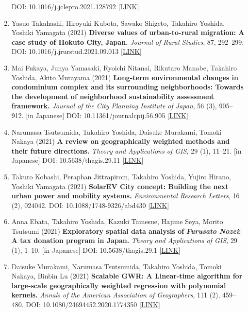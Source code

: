 \documentclass[]{book}
\begin{document}
\begin{enumerate}
  DOI: 10.1016/j.jclepro.2021.128792 {[}\href{https://doi.org/10.1016/j.jclepro.2021.128792}{LINK}{]}
\item
  Yasuo Takahashi, Hiroyuki Kubota, Sawako Shigeto, Takahiro Yoshida, Yoshiki Yamagata (2021)
  \textbf{Diverse values of urban-to-rural migration: A case study of Hokuto City, Japan.}
  \emph{Journal of Rural Studies}, 87, 292--299.
  DOI: 10.1016/j.jrurstud.2021.09.013 {[}\href{https://www.sciencedirect.com/science/article/abs/pii/S0743016721002771}{LINK}{]}
\item
  Mai Fukaya, Junya Yamasaki, Ryoichi Nitanai, Rikutaro Manabe, Takahiro Yoshida, Akito Murayama (2021)
  \textbf{Long-term environmental changes in condominium complex and its surrounding neighborhoods: Towards the development of neighborhood sustainability assessment framework.}
  \emph{Journal of the City Planning Institute of Japan}, 56 (3), 905--912. {[}in Japanese{]}
  DOI: 10.11361/journalcpij.56.905 {[}\href{https://www.jstage.jst.go.jp/article/journalcpij/56/3/56_905/_article/-char/en}{LINK}{]}
\item
  Narumasa Tsutsumida, Takahiro Yoshida, Daisuke Murakami, Tomoki Nakaya (2021)
  \textbf{A review on geographically weighted methods and their future directions.}
  \emph{Theory and Applications of GIS,} 29 (1), 11--21. {[}in Japanese{]}
  DOI: 10.5638/thagis.29.11 {[}\href{https://www.gisa-japan.org/dl/gisajounal.html}{LINK}{]}
\item
  Takuro Kobashi, Peraphan Jittrapirom, Takahiro Yoshida, Yujiro Hirano, Yoshiki Yamagata (2021)
  \textbf{SolarEV City concept: Building the next urban power and mobility systems.}
  \emph{Environmental Research Letters}, 16 (2), 024042.
  DOI: 10.1088/1748-9326/abd430 {[}\href{https://doi.org/10.1088/1748-9326/abd430}{LINK}{]}
\item
  Anna Ebata, Takahiro Yoshida, Kazuki Tamesue, Hajime Seya, Morito Tsutsumi (2021)
  \textbf{Exploratory spatial data analysis of} \textbf{\emph{Furusato Nozei}: A tax donation program in Japan.}
  \emph{Theory and Applications of GIS,} 29 (1), 1--10. {[}in Japanese{]}
  DOI: 10.5638/thagis.29.1 {[}\href{https://www.gisa-japan.org/dl/gisajounal.html}{LINK}{]}
\item
  Daisuke Murakami, Narumasa Tsutsumida, Takahiro Yoshida, Tomoki Nakaya, Binbin Lu (2021)
  \textbf{Scalable GWR: A Linear-time algorithm for large-scale geographically weighted regression with polynomial kernels.}
  \emph{Annals of the American Association of Geographers}, 111 (2), 459--480.
  DOI: 10.1080/24694452.2020.1774350 {[}\href{https://www.tandfonline.com/doi/full/10.1080/24694452.2020.1774350}{LINK}{]}

\end{enumerate}
\end{document}
